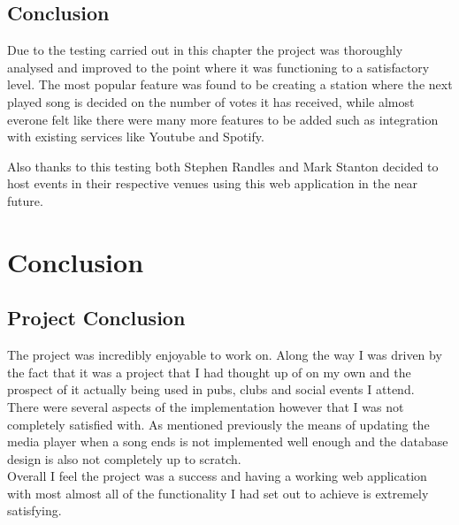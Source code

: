 \documentclass[a4paper, 12pt]{report}
\begin{document}
\section{Conclusion}
Due to the testing carried out in this chapter the project was thoroughly analysed and improved to the point where it was functioning to a satisfactory level. The most popular feature was found to be creating a station where the next played song is decided on the number of votes it has received, while almost everone felt like there were many more features to be added such as integration with existing services like Youtube and Spotify. 

Also thanks to this testing both Stephen Randles and Mark Stanton decided to host events in their respective venues using this web application in the near future.

\chapter{Conclusion}

\section{Project Conclusion}
The project was incredibly enjoyable to work on. Along the way I was driven by the fact that it was a project that I had thought up of on my own and the prospect of it actually being used in pubs, clubs and social events I attend. \\
There were several aspects of the implementation however that I was not completely satisfied with. As mentioned previously the means of updating the media player when a song ends is not implemented well enough and the database design is also not completely up to scratch.\\
Overall I feel the project was a success and having a working web application with most almost all of the functionality I had set out to achieve is extremely satisfying. \\
\end{document}
